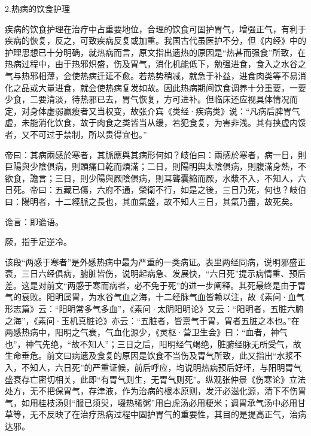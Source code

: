 \documentclass[draft,12pt]{ctexbook}
\begin{document}
2.热病的饮食护理

疾病的饮食护理在治疗中占重要地位，合理的饮食可固护胃气，增强正气，有利于疾病的恢复，反之，可致疾病反复或加重。我国古代虽医护不分，但《内经》中的护理思想已十分明确，就热病而言，原文指出遗热的原因是“热甚而强食”所致，在热病过程中，由于热邪炽盛，伤及胃气，消化机能低下，勉强进食，食入之水谷之气与热邪相薄，会使热病迁延不愈。若热势稍减，就急于补益，进食肉类等不易消化之品或大量进食，就会使热病复发如故。因此热病期间饮食调养十分重要，一要少食，二要清淡，待热邪已去，胃气恢复，方可进补。但临床还应视具体情况而定，对身体虚弱赢瘦者又当权变，故张介宾《类经·疾病类》说：“凡病后脾胃气虚，未能消化饮食，故于肉食之类皆当从缓，若犯食复，为害非浅。其有挟虚内馁者，又不可过于禁制，所以贵得宜也。”


\begin{yuanwen}
帝曰：其病兩感於寒者，其脈應與其病形何如？岐伯曰：兩感於寒者，病一日，則巨陽與少陰俱病，則頭痛口乾而煩滿；二日，則陽明舆太陰俱病，則腹滿身熱，不欲食，譫言；三日，則少陽與厥陰俱病，則耳聾囊縮而厥，水漿不入，不知人，六日死。帝曰：五藏已傷，六府不通，榮衛不行，如是之後，三日乃死，何也？岐伯曰：陽明者，十二經脈之長也，其血氣盛，故不知人三日，其氣乃盡，故死矣。
\end{yuanwen}


\begin{jiaozhu}
	\item 谵言：即谵语。
	\item 厥，指手足逆冷。
\end{jiaozhu}



该段“两感于寒者”是外感热病中最为严重的一类病证。表里两经同病，说明邪盛正衰，三日六经俱病，腑脏皆伤，说明起病急、发展快，“六日死”提示病情重、预后差。这是对前文“两感于寒而病者，必不免于死”的进一步阐释。其死最终是由于胃气的衰败。阳明属胃，为水谷气血之海，十二经脉气血皆赖以注，故《素问·血气形志篇》云：“阳明常多气多血”，《素问·太阴阳明论》又云：“阳明者，五脏六腑之海”，《素问·玉机真脏论》亦云：“五脏者，皆禀气于胃，胃者五脏之本也。”在两感热病中，阳明之气衰，气血化源少，《灵枢·营卫生会》曰：“血者，神气也”，神气先绝，“故不知人”；三日之后，阳明经气竭绝，脏腑经脉无所受气，故生命垂危。前文曰病遗及食复的原因是饮食不当伤及胃气所致，此又指出“水浆不入，不知人，六日死”的严重证候，前后呼应，均说明热病预后好坏，与阳明胃气盛衰存亡密切相关，此即“有胃气则生，无胃气则死”。纵观张仲景《伤寒论》立法处方，无不把保胃气，存津液，作为治病的根本原则，发汗必滋化源，清下不伤胃气，如用桂枝汤则“服已须臾，啜热稀粥”用白虎汤必用粳米；调胃承气汤中必用甘草等，无不反映了在治疗热病过程中固护胃气的重要性，其目的是提高正气，治病达邪。
\end{document}
